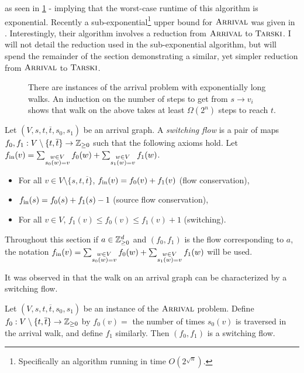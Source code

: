 as seen in \cref{expLongArrival} - implying that the worst-case runtime of this algorithm is exponential.
Recently a sub-exponential\footnote{Specifically an algorithm running
in time $O(2^{\sqrt{n}})$.} upper bound for $\textsc{Arrival}$ was given in \citep{gärtner2021subexponential}.
Interestingly, their algorithm involves a reduction from $\textsc{Arrival}$ to $\textsc{Tarski}$. I will not detail
the reduction used in the sub-exponential algorithm, but will spend the remainder of the section
demonstrating a similar, yet simpler reduction from $\textsc{Arrival}$ to $\textsc{Tarski}$.
\begin{figure}[h]
  \centering
  
  \caption{There are instances of the arrival problem with exponentially long walks. An induction
  on the number of steps to get from $s \to v_i$ shows that walk on the above
  takes at least $\Omega(2^n)$ steps to reach $t$.}\label{expLongArrival}
\end{figure}
\begin{definition}
  Let $(V, s, t, \overline{t}, s_0, s_1)$ be an arrival graph. A \emph{switching flow} is a pair of maps 
  $f_0, f_1 : V \setminus \{t, \overline{t}\} \to \mathbb{Z}_{\geq 0}$ such that the following axioms hold.
    Let $f_{\text{in}}(v) =
        \sum_{\substack{w \in V \\ s_0(w) = v}} f_0(w) 
        + \sum_{\substack{w \in V \\ s_1(w) = v}} f_1(w)$. 
  \begin{itemize}
    \item For all $v \in V \setminus \{s, t, \overline{t}\}$, $f_{\text{in}}(v) = f_0(v) + f_1(v)$ (flow conservation),
    \item $f_{\text{in}}(s) = f_0(s) + f_1(s) - 1$ (source flow conservation),
    \item For all $v \in V$, $f_1(v) \leq f_0(v) \leq f_1(v) + 1$ (switching).
  \end{itemize}
\end{definition}
\begin{notation}
  Throughout this section if $a \in \mathbb{Z}_{\geq 0}^d$ and $(f_0, f_1)$ is the flow
  corresponding to $a$, the notation $f_{\text{in}}(v) =
        \sum_{\substack{w \in V \\ s_0(w) = v}} f_0(w) 
        + \sum_{\substack{w \in V \\ s_1(w) = v}} f_1(w)$ will be used. 
\end{notation}
  It was observed in \citep{arrivalBasic} that the walk on an arrival graph can be characterized
  by a switching flow.
  \begin{lemma}\label{walkSwitching}
    Let $(V, s, t, \overline{t}, s_0, s_1)$ be an instance of the $\textsc{Arrival}$ problem. Define
    $f_0 : V \setminus \{t, \overline{t}\} \to \mathbb{Z}_{\geq 0}$ by $f_0(v) =$ the number of times $s_0(v)$
    is traversed in the arrival walk, and define $f_1$ similarly. Then $(f_0, f_1)$ is a switching
    flow.
  \end{lemma}
